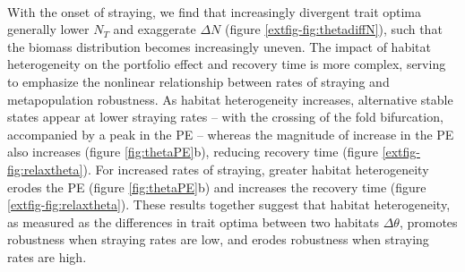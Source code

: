 \documentclass{revtex4}
\begin{document}
\\ 
\noindent With the onset of straying, we find that increasingly divergent trait optima generally lower $N_T$ and exaggerate $\Delta N$ (figure \ref{extfig-fig:thetadiffN}), such that the biomass distribution becomes increasingly uneven. %
The impact of habitat heterogeneity on the portfolio effect and recovery time is more complex, serving to emphasize the nonlinear relationship between rates of straying and metapopulation robustness. %
As habitat heterogeneity increases, alternative stable states appear at lower straying rates -- with the crossing of the fold bifurcation, accompanied by a peak in the PE -- whereas the magnitude of increase in the PE also increases (figure \ref{fig:thetaPE}b), reducing recovery time (figure \ref{extfig-fig:relaxtheta}).
For increased rates of straying, greater habitat heterogeneity erodes the PE (figure \ref{fig:thetaPE}b) and increases the recovery time (figure \ref{extfig-fig:relaxtheta}).
These results together suggest that habitat heterogeneity, as measured as the differences in trait optima between two habitats $\Delta\theta$, promotes robustness when straying rates are low, and erodes robustness when straying rates are high.
\end{document}
